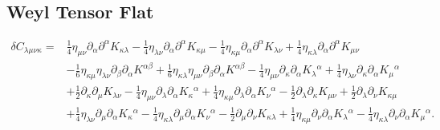 \documentclass[10pt,letterpaper]{article}
\begin{document}
\subsection*{Weyl Tensor Flat}
\begin{align}
\delta C_{\lambda\mu\nu\kappa}={}&\tfrac{1}{4} \eta_{\mu \nu} \partial_{\alpha}\partial^{\alpha}K_{\kappa \lambda}
 -  \tfrac{1}{4} \eta_{\lambda \nu} \partial_{\alpha}\partial^{\alpha}K_{\kappa \mu}
 -  \tfrac{1}{4} \eta_{\kappa \mu} \partial_{\alpha}\partial^{\alpha}K_{\lambda \nu}
 + \tfrac{1}{4} \eta_{\kappa \lambda} \partial_{\alpha}\partial^{\alpha}K_{\mu \nu}\nonumber\\
& -  \tfrac{1}{6} \eta_{\kappa \mu} \eta_{\lambda \nu} \partial_{\beta}\partial_{\alpha}K^{\alpha \beta}
 + \tfrac{1}{6} \eta_{\kappa \lambda} \eta_{\mu \nu} \partial_{\beta}\partial_{\alpha}K^{\alpha \beta}
 -  \tfrac{1}{4} \eta_{\mu \nu} \partial_{\kappa}\partial_{\alpha}K_{\lambda}{}^{\alpha}
 + \tfrac{1}{4} \eta_{\lambda \nu} \partial_{\kappa}\partial_{\alpha}K_{\mu}{}^{\alpha}\nonumber\\
& + \tfrac{1}{2} \partial_{\kappa}\partial_{\mu}K_{\lambda \nu}
 -  \tfrac{1}{4} \eta_{\mu \nu} \partial_{\lambda}\partial_{\alpha}K_{\kappa}{}^{\alpha}
 + \tfrac{1}{4} \eta_{\kappa \mu} \partial_{\lambda}\partial_{\alpha}K_{\nu}{}^{\alpha}
 -  \tfrac{1}{2} \partial_{\lambda}\partial_{\kappa}K_{\mu \nu}
 + \tfrac{1}{2} \partial_{\lambda}\partial_{\nu}K_{\kappa \mu}\nonumber\\
& + \tfrac{1}{4} \eta_{\lambda \nu} \partial_{\mu}\partial_{\alpha}K_{\kappa}{}^{\alpha}
 -  \tfrac{1}{4} \eta_{\kappa \lambda} \partial_{\mu}\partial_{\alpha}K_{\nu}{}^{\alpha}
 -  \tfrac{1}{2} \partial_{\mu}\partial_{\nu}K_{\kappa \lambda}
 + \tfrac{1}{4} \eta_{\kappa \mu} \partial_{\nu}\partial_{\alpha}K_{\lambda}{}^{\alpha}
 -  \tfrac{1}{4} \eta_{\kappa \lambda} \partial_{\nu}\partial_{\alpha}K_{\mu}{}^{\alpha}.
\end{align}
\end{document}
